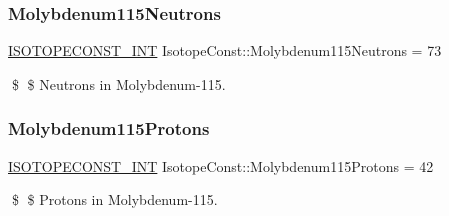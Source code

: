 \subsubsection{\texorpdfstring{Molybdenum115\+Neutrons}{Molybdenum115Neutrons}}
{\footnotesize\ttfamily \mbox{\hyperlink{group___isotope_const-_macros_ga5f18360b3e99483a35c32d789e62621c}{I\+S\+O\+T\+O\+P\+E\+C\+O\+N\+S\+T\+\_\+\+I\+NT}} Isotope\+Const\+::\+Molybdenum115\+Neutrons = 73}

\$ \$ Neutrons in Molybdenum-\/115. \mbox{\label{group___isotope_const-_molybdenum-_mo115_gae054f368b071ea203b0e046570ff2114}} 
\subsubsection{\texorpdfstring{Molybdenum115\+Protons}{Molybdenum115Protons}}
{\footnotesize\ttfamily \mbox{\hyperlink{group___isotope_const-_macros_ga5f18360b3e99483a35c32d789e62621c}{I\+S\+O\+T\+O\+P\+E\+C\+O\+N\+S\+T\+\_\+\+I\+NT}} Isotope\+Const\+::\+Molybdenum115\+Protons = 42}

\$ \$ Protons in Molybdenum-\/115. 